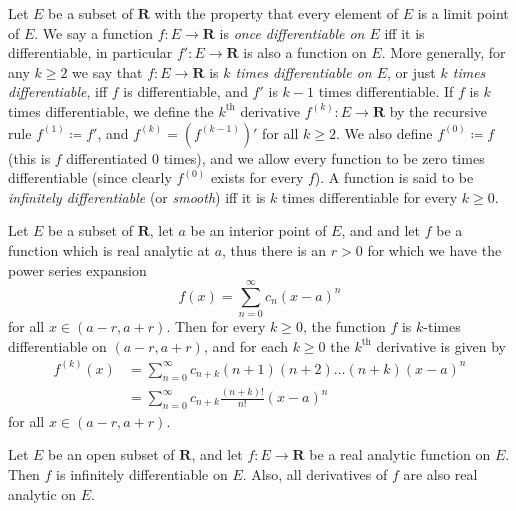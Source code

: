 \begin{definition}\label{4.2.4}
    Let \(E\) be a subset of \(\mathbf{R}\) with the property that every element of \(E\) is a limit point of \(E\).
    We say a function \(f : E \to \mathbf{R}\) is \emph{once differentiable on \(E\)} iff it is differentiable, in particular \(f': E \to \mathbf{R}\) is also a function on \(E\).
    More generally, for any \(k \geq 2\) we say that \(f : E \to \mathbf{R}\) is \emph{\(k\) times differentiable on \(E\)}, or just \emph{\(k\) times differentiable}, iff \(f\) is differentiable, and \(f'\) is \(k - 1\) times differentiable.
    If \(f\) is \(k\) times differentiable, we define the \(k^{\text{th}}\) derivative \(f^{(k)} : E \to \mathbf{R}\) by the recursive rule \(f^{(1)} \coloneqq f'\), and \(f^{(k)} = (f^{(k - 1)})'\) for all \(k \geq 2\).
    We also define \(f^{(0)} \coloneqq f\) (this is \(f\) differentiated \(0\) times), and we allow every function to be zero times differentiable (since clearly \(f^{(0)}\) exists for every \(f\)).
    A function is said to be \emph{infinitely differentiable} (or \emph{smooth}) iff it is \(k\) times differentiable for every \(k \geq 0\).
\end{definition}

\setcounter{theorem}{5}
\begin{proposition}\label{4.2.6}
    Let \(E\) be a subset of \(\mathbf{R}\), let \(a\) be an interior point of \(E\), and and let \(f\) be a function which is real analytic at \(a\), thus there is an \(r > 0\) for which we have the power series expansion
    \[
        f(x) = \sum_{n = 0}^\infty c_n (x - a)^n
    \]
    for all \(x \in (a - r, a + r)\).
    Then for every \(k \geq 0\), the function \(f\) is \(k\)-times differentiable on \((a - r, a + r)\), and for each \(k \geq 0\) the \(k^{\text{th}}\) derivative is given by
    \begin{align*}
        f^{(k)}(x) & = \sum_{n = 0}^\infty c_{n + k} (n + 1) (n + 2) \dots (n + k) (x - a)^n \\
                   & = \sum_{n = 0}^\infty c_{n + k} \frac{(n + k)!}{n!} (x - a)^n
    \end{align*}
    for all \(x \in (a - r, a + r)\).
\end{proposition}

\begin{corollary}\label{4.2.7}
    Let \(E\) be an open subset of \(\mathbf{R}\), and let \(f : E \to \mathbf{R}\) be a real analytic function on \(E\).
    Then \(f\) is infinitely differentiable on \(E\).
    Also, all derivatives of \(f\) are also real analytic on \(E\).
\end{corollary}

